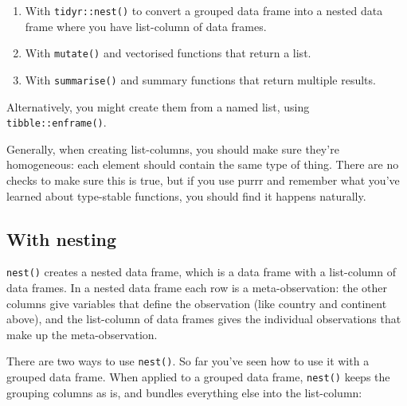 \documentclass[]{book}
\newenvironment{Shaded}{\begin{snugshade}}{\end{snugshade}}
\newcommand{\KeywordTok}[1]{\textcolor[rgb]{0.13,0.29,0.53}{\textbf{{#1}}}}
\newcommand{\StringTok}[1]{\textcolor[rgb]{0.31,0.60,0.02}{{#1}}}
\newcommand{\CommentTok}[1]{\textcolor[rgb]{0.56,0.35,0.01}{\textit{{#1}}}}
\newcommand{\NormalTok}[1]{{#1}}
\begin{document}
\begin{enumerate}
\def\labelenumi{\arabic{enumi}.}
\item
  With \texttt{tidyr::nest()} to convert a grouped data frame into a
  nested data frame where you have list-column of data frames.
\item
  With \texttt{mutate()} and vectorised functions that return a list.
\item
  With \texttt{summarise()} and summary functions that return multiple
  results.
\end{enumerate}

Alternatively, you might create them from a named list, using
\texttt{tibble::enframe()}.

Generally, when creating list-columns, you should make sure they're
homogeneous: each element should contain the same type of thing. There
are no checks to make sure this is true, but if you use purrr and
remember what you've learned about type-stable functions, you should
find it happens naturally.

\subsection{With nesting}\label{with-nesting}

\texttt{nest()} creates a nested data frame, which is a data frame with
a list-column of data frames. In a nested data frame each row is a
meta-observation: the other columns give variables that define the
observation (like country and continent above), and the list-column of
data frames gives the individual observations that make up the
meta-observation.

There are two ways to use \texttt{nest()}. So far you've seen how to use
it with a grouped data frame. When applied to a grouped data frame,
\texttt{nest()} keeps the grouping columns as is, and bundles everything
else into the list-column:

\begin{Shaded}
\end{Shaded}
\end{document}
